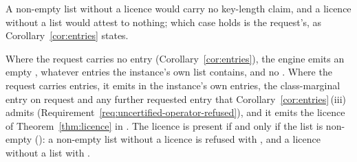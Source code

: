 
A non-empty list without a licence would carry no key-length claim, and a
licence without a list would attest to nothing; which case holds is the
request's, as Corollary~\ref{cor:entries} states.

\begin{requirement}\label{req:constraint-list-by-request}
Where the request carries no entry (Corollary~\ref{cor:entries}), the engine
emits an empty , whatever entries the instance's own
list contains, and no . Where the request carries
entries, it emits in  the instance's own entries, the
class-marginal entry on request and any further requested entry that
Corollary~\ref{cor:entries}\,(iii) admits
(Requirement~\ref{req:uncertified-operator-refused}), and it emits
the licence of Theorem~\ref{thm:licence} in . The
licence is present if and only if the list is non-empty
(): a non-empty list without a licence is refused
with , and a licence without a list with
.
\end{requirement}
